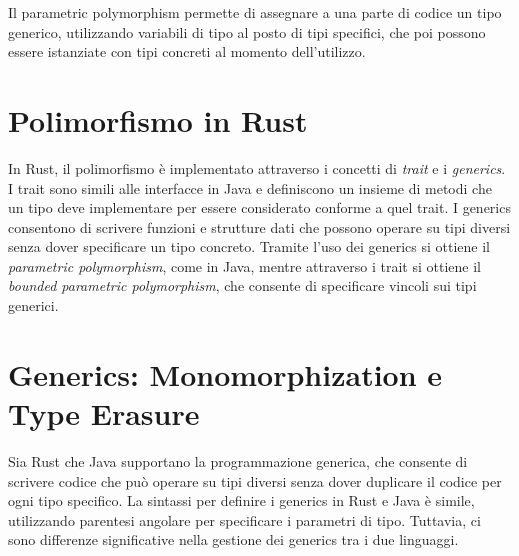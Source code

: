 Il parametric polymorphism permette di assegnare a una parte di codice un tipo generico, utilizzando variabili di tipo al posto di tipi specifici, che poi possono essere istanziate con tipi concreti al momento dell'utilizzo.
\section{Polimorfismo in Rust}
In Rust, il polimorfismo è implementato attraverso i concetti di \textit{trait} e i \textit{generics}. I trait sono simili alle interfacce in Java e definiscono un insieme di metodi che un tipo deve implementare per essere considerato conforme a quel trait. I generics consentono di scrivere funzioni e strutture dati che possono operare su tipi diversi senza dover specificare un tipo concreto. Tramite l'uso dei generics si ottiene il \textit{parametric polymorphism}, come in Java, mentre attraverso i trait si ottiene il \textit{bounded parametric polymorphism}, che consente di specificare vincoli sui tipi generici.
\section{Generics: Monomorphization e Type Erasure}
Sia Rust che Java supportano la programmazione generica, che consente di scrivere codice che può operare su tipi diversi senza dover duplicare il codice per ogni tipo specifico. La sintassi per definire i generics in Rust e Java è simile, utilizzando parentesi angolare per specificare i parametri di tipo. Tuttavia, ci sono differenze significative nella gestione dei generics tra i due linguaggi.

